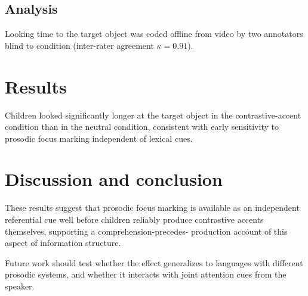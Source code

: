 \documentclass{cascadilla}
\begin{document}
\subsection{Analysis}
Looking time to the target object was coded offline from video by two
annotators blind to condition (inter-rater agreement $\kappa = 0.91$).

\section{Results}
Children looked significantly longer at the target object in the
contrastive-accent condition than in the neutral condition, consistent
with early sensitivity to prosodic focus marking independent of
lexical cues.

\section{Discussion and conclusion}
These results suggest that prosodic focus marking is available as an
independent referential cue well before children reliably produce
contrastive accents themselves, supporting a comprehension-precedes-
production account of this aspect of information structure.

Future work should test whether the effect generalizes to languages
with different prosodic systems, and whether it interacts with joint
attention cues from the speaker.

\end{document}

